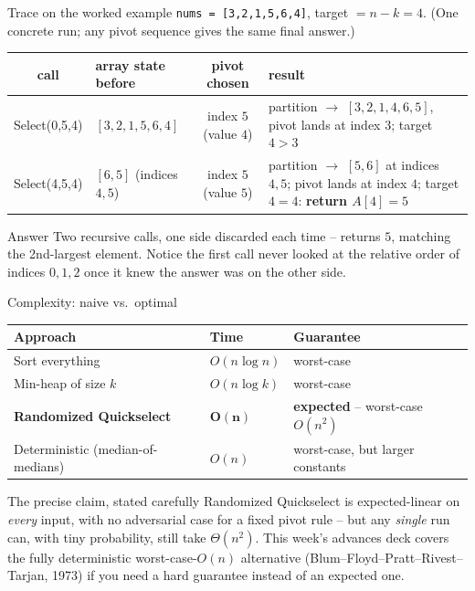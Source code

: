 \documentclass[11pt,aspectratio=169]{beamer}
\begin{document}
\begin{frame}{Trace on the worked example}
  \scriptsize
  \texttt{nums = [3,2,1,5,6,4]}, target $= n-k = 4$. (One concrete run; any pivot
  sequence gives the same final answer.)
  \begin{center}
  \begin{tabular}{@{}c p{4.2cm} c p{3.5cm}@{}}
    \toprule
    call & array state before & pivot chosen & result \\
    \midrule
    Select(0,5,4) & $[3,2,1,5,6,4]$ & index $5$ (value $4$) & partition $\to$
    $[3,2,1,4,6,5]$, pivot lands at index $3$; target $4>3$ \\
    Select(4,5,4) & $[6,5]$ (indices $4,5$) & index $5$ (value $5$) & partition $\to$
    $[5,6]$ at indices $4,5$; pivot lands at index $4$; target $4=4$: \textbf{return
    $A[4]=5$} \\
    \bottomrule
  \end{tabular}
  \end{center}
  \begin{exampleblock}{Answer}
    Two recursive calls, one side discarded each time -- returns $5$, matching the
    2nd-largest element. Notice the first call never looked at the relative order of
    indices $0,1,2$ once it knew the answer was on the other side.
  \end{exampleblock}
\end{frame}

\begin{frame}{Complexity: naive vs.\ optimal}
  \begin{center}
  \begin{tabular}{@{}lll@{}}
    \toprule
    Approach & Time & Guarantee \\
    \midrule
    Sort everything & $O(n\log n)$ & worst-case \\
    Min-heap of size $k$ & $O(n\log k)$ & worst-case \\
    \textbf{Randomized Quickselect} & $\boldsymbol{O(n)}$ & \textbf{expected} --
    worst-case $O(n^2)$ \\
    Deterministic (median-of-medians) & $O(n)$ & worst-case, but larger constants \\
    \bottomrule
  \end{tabular}
  \end{center}
  \begin{alertblock}{The precise claim, stated carefully}
    Randomized Quickselect is expected-linear on \emph{every} input, with no
    adversarial case for a fixed pivot rule -- but any \emph{single} run can, with tiny
    probability, still take $\Theta(n^2)$. This week's advances deck covers the fully
    deterministic worst-case-$O(n)$ alternative (Blum--Floyd--Pratt--Rivest--Tarjan,
    1973) if you need a hard guarantee instead of an expected one.
  \end{alertblock}
\end{frame}
\end{document}
